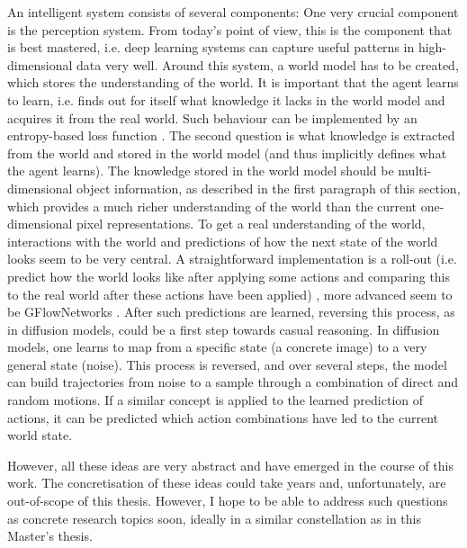 An intelligent system consists of several components: One very crucial component is the perception system. From today's point of view, this is the component that is best mastered, i.e. deep learning systems can capture useful patterns in high-dimensional data very well. Around this system, a world model has to be created, which stores the understanding of the world. It is important that the agent learns to learn, i.e. finds out for itself what knowledge it lacks in the world model and acquires it from the real world. Such behaviour can be implemented by an entropy-based loss function . The second question is what knowledge is extracted from the world and stored in the world model (and thus implicitly defines what the agent learns). The knowledge stored in the world model should be multi-dimensional object information, as described in the first paragraph of this section, which provides a much richer understanding of the world than the current one-dimensional pixel representations. To get a real understanding of the world, interactions with the world and predictions of how the next state of the world looks seem to be very central. A straightforward implementation is a roll-out (i.e. predict how the world looks like after applying some actions and comparing this to the real world after these actions have been applied) , more advanced seem to be GFlowNetworks . After such predictions are learned, reversing this process, as in diffusion models, could be a first step towards casual reasoning. In diffusion models, one learns to map from a specific state (a concrete image) to a very general state (noise). This process is reversed, and over several steps, the model can build trajectories from noise to a sample through a combination of direct and random motions. If a similar concept is applied to the learned prediction of actions, it can be predicted which action combinations have led to the current world state.

However, all these ideas are very abstract and have emerged in the course of this work. The concretisation of these ideas could take years and, unfortunately, are out-of-scope of this thesis. However, I hope to be able to address such questions as concrete research topics soon, ideally in a similar constellation as in this Master's thesis.

